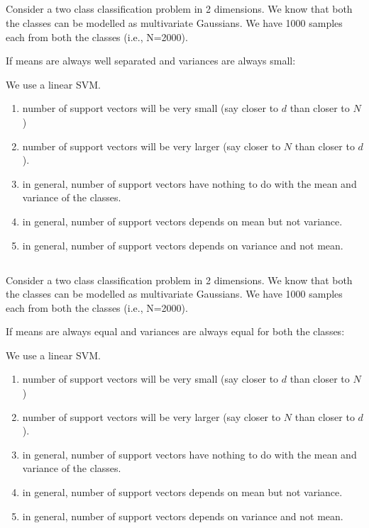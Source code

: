 
\begin{frame}
\section{}
Consider a two class classification problem in 2 dimensions. We know that both the classes can be modelled as multivariate Gaussians. We have 1000 samples each from both the classes (i.e., N=2000).

If means are always well separated and variances are always small:

We use a linear SVM.
\begin{enumerate}[label=(\Alph*)]
\item number of support vectors will be very small (say closer to $d$ than closer to $N$)   %
\item number of support vectors will be very larger (say closer to $N$ than closer to $d$).
\item in general, number of support vectors have nothing to do with the mean and variance of the classes.   %
\item in general, number of support vectors depends on mean but not variance.
\item in general, number of support vectors depends on variance and not mean.
\end{enumerate}

\end{frame}


\begin{frame}
\section{}
Consider a two class classification problem in 2 dimensions. We know that both the classes can be modelled as multivariate Gaussians. We have 1000 samples each from both the classes (i.e., N=2000).

If means  are always equal and variances are  always equal for both the classes:

We use a linear SVM.

\begin{enumerate}[label=(\Alph*)]
\item number of support vectors will be very small (say closer to $d$ than closer to $N$)
\item number of support vectors will be very larger (say closer to $N$ than closer to $d$).    %
\item in general, number of support vectors have nothing to do with the mean and variance of the classes.    %
\item in general, number of support vectors depends on mean but not variance.
\item in general, number of support vectors depends on variance and not mean.
\end{enumerate}
\end{frame}


